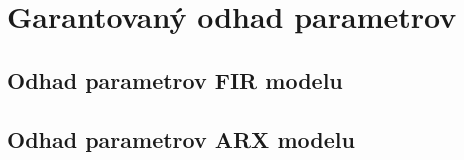 \section{Garantovaný odhad parametrov}

\subsection{Odhad parametrov FIR modelu}

\subsection{Odhad parametrov ARX modelu}

